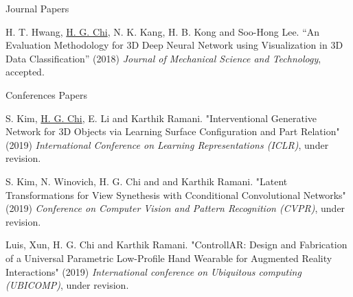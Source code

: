 


\begin{cventries}


\cventry
{} %
{Journal Papers} %
{} %
{} %
{ %
\begin{cvitems}
\item {H. T. Hwang, \underline{H. G. Chi}, N. K. Kang, H. B. Kong and Soo-Hong Lee. “An Evaluation Methodology for 3D Deep Neural Network using Visualization in 3D Data Classification” (2018) \textit{Journal of Mechanical Science and Technology}, accepted.}
\end{cvitems}
}


\cventry
{} %
{Conferences Papers} %
{} %
{} %
{ %
\begin{cvitems}
\item {S. Kim, \underline{H. G. Chi}, E. Li and Karthik Ramani. "Interventional Generative Network for 3D Objects via Learning Surface Configuration and Part Relation" (2019) \textit{International Conference on Learning Representations (ICLR)}, under revision.}
\item {S. Kim, N. Winovich, H. G. Chi and and Karthik Ramani. "Latent Transformations for View Synethesis with Cconditional Convolutional Networks" (2019) \textit{Conference on Computer Vision and Pattern Recognition (CVPR)}, under revision.}
\item {Luis, Xun, H. G. Chi and Karthik Ramani. "ControllAR: Design and Fabrication of a Universal Parametric Low-Profile Hand Wearable for Augmented Reality Interactions" (2019) \textit{International conference on Ubiquitous computing (UBICOMP)}, under revision.}
\end{cvitems}
}


\end{cventries}